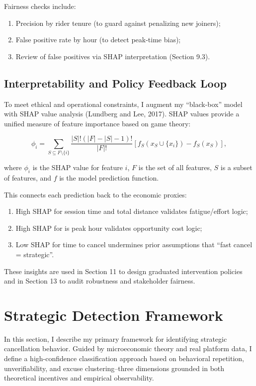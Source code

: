 \documentclass[12pt,letterpaper]{article}
\begin{document}
Fairness checks include:
\begin{enumerate}
    \item Precision by rider tenure (to guard against penalizing new joiners);
    \item False positive rate by hour (to detect peak-time bias);
    \item Review of false positives via SHAP interpretation (Section 9.3).
\end{enumerate}

\subsection{Interpretability and Policy Feedback Loop}

To meet ethical and operational constraints, I augment my ``black-box'' model with SHAP value analysis (Lundberg and Lee, 2017). SHAP values provide a unified measure of feature importance based on game theory:

\begin{equation}
\phi_i = \sum_{S \subseteq F \setminus \{i\}} \frac{|S|!(|F| - |S| - 1)!}{|F|!} [f_S(x_S \cup \{x_i\}) - f_S(x_S)],
\end{equation}

where $\phi_i$ is the SHAP value for feature $i$, $F$ is the set of all features, $S$ is a subset of features, and $f$ is the model prediction function.

This connects each prediction back to the economic proxies:

\begin{enumerate}
    \item High SHAP for session time and total distance validates fatigue/effort logic;
    \item High SHAP for is peak hour validates opportunity cost logic;
    \item Low SHAP for time to cancel undermines prior assumptions that ``fast cancel = strategic''.
\end{enumerate}

These insights are used in Section 11 to design graduated intervention policies and in Section 13 to audit robustness and stakeholder fairness.

\section{Strategic Detection Framework}

In this section, I describe my primary framework for identifying strategic cancellation behavior. Guided by microeconomic theory and real platform data, I define a high-confidence classification approach based on behavioral repetition, unverifiability, and excuse clustering--three dimensions grounded in both theoretical incentives and empirical observability.
\end{document}
